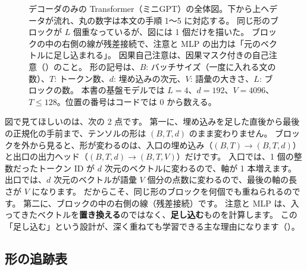 \begin{figure}[tbp]
\caption{デコーダのみの Transformer（ミニGPT）の全体図。下から上へデータが流れ、丸の数字は本文の手順 1〜5 に対応する。
同じ形のブロックが $L$ 個重なっているが、図には 1 個だけを描いた。
ブロックの中の右側の線が残差接続で、注意と MLP の出力は「元のベクトルに足し込まれる」。
因果自己注意は、因果マスク付きの自己注意（）のこと。
形の記号は、$B$: バッチサイズ（一度に入れる文の数）、$T$: トークン数、$d$: 埋め込みの次元、$V$: 語彙の大きさ、$L$: ブロックの数。
本書の基盤モデルでは $L=4$、$d=192$、$V=4096$、$T\le 128$。位置の番号はコードでは 0 から数える。}
\label{fig:tf-overview}
\end{figure}

図で見てほしいのは、次の 2 点です。
第一に、埋め込みを足した直後から最後の正規化の手前まで、テンソルの形は $(B,T,d)$ のまま変わりません。
ブロックを外から見ると、形が変わるのは、入口の埋め込み（$(B,T)\to(B,T,d)$）と出口の出力ヘッド（$(B,T,d)\to(B,T,V)$）だけです。
入口では、1 個の整数だったトークン ID が $d$ 次元のベクトルに変わるので、軸が 1 本増えます。
出口では、$d$ 次元のベクトルが語彙 $V$ 個分の点数に変わるので、最後の軸の長さが $V$ になります。
だからこそ、同じ形のブロックを何個でも重ねられるのです。
第二に、ブロックの中の右側の線（残差接続）です。
注意と MLP は、入ってきたベクトルを\textbf{置き換える}のではなく、\textbf{足し込む}ものを計算します。
この「足し込む」という設計が、深く重ねても学習できる主な理由になります（）。

\subsection*{形の追跡表}

